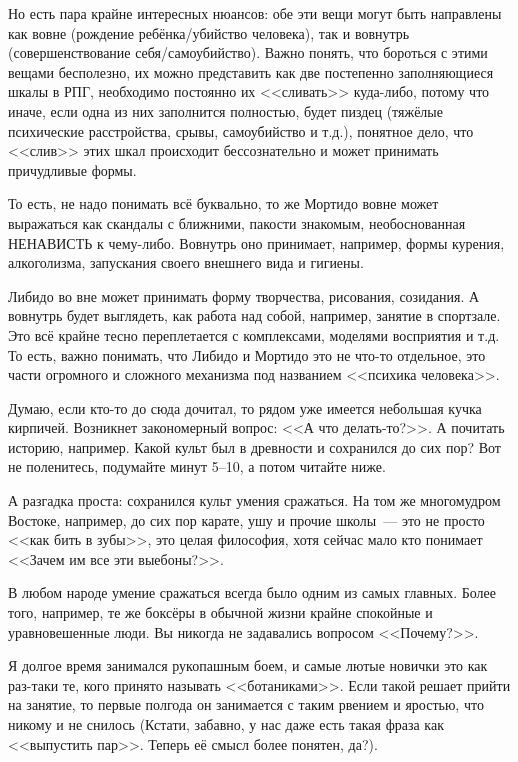 \documentclass[a4paper,14pt,oneside]{memoir}
\begin{document}
Но есть пара крайне интересных нюансов: обе эти вещи могут быть направлены как вовне (рождение ребёнка/убийство человека), так и вовнутрь (совершенствование себя/самоубийство). Важно понять, что бороться с этими вещами бесполезно, их можно представить как две постепенно заполняющиеся шкалы в РПГ, необходимо постоянно их <<сливать>> куда-либо, потому что иначе, если одна из них заполнится полностью, будет пиздец (тяжёлые психические расстройства, срывы, самоубийство и т.д.), понятное дело, что <<слив>> этих шкал происходит бессознательно и может принимать причудливые формы. 

То есть, не надо понимать всё буквально, то же Мортидо вовне может выражаться как скандалы с ближними, пакости знакомым, необоснованная НЕНАВИСТЬ к чему-либо. Вовнутрь оно принимает, например, формы курения, алкоголизма, запускания своего внешнего вида и гигиены. 

Либидо во вне может принимать форму творчества, рисования, созидания. А вовнутрь будет выглядеть, как работа над собой, например, занятие в спортзале. Это всё крайне тесно переплетается с комплексами, моделями восприятия и т.д. То есть, важно понимать, что Либидо и Мортидо это не что-то отдельное, это части огромного и сложного механизма под названием <<психика человека>>. 

Думаю, если кто-то до сюда дочитал, то рядом уже имеется небольшая кучка кирпичей. Возникнет закономерный вопрос: <<А что делать-то?>>. А почитать историю, например. Какой культ был в древности и сохранился до сих пор? Вот не поленитесь, подумайте минут 5--10, а потом читайте ниже. 

А разгадка проста: сохранился культ умения сражаться. На том же многомудром Востоке, например, до сих пор карате, ушу и прочие школы~--- это не просто <<как бить в зубы>>, это целая философия, хотя сейчас мало кто понимает <<Зачем им все эти выебоны?>>.
 
В любом народе умение сражаться всегда было одним из самых главных. Более того, например, те же боксёры в обычной жизни крайне спокойные и уравновешенные люди. Вы никогда не задавались вопросом <<Почему?>>.

Я долгое время занимался рукопашным боем, и самые лютые новички это как раз-таки те, кого принято называть <<ботаниками>>. Если такой решает прийти на занятие, то первые полгода он занимается с таким рвением и яростью, что никому и не снилось (Кстати, забавно, у нас даже есть такая фраза как <<выпустить пар>>. Теперь её смысл более понятен, да?).
\end{document}
